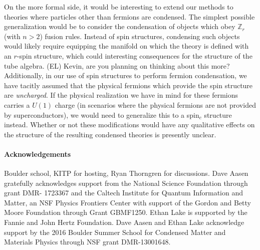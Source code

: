 \documentclass[12pt,a4paper]{article}
\newcommand{\zz}{\mathbb{Z}}
\newcommand{\mcc}{\mathcal{C}}
\newcommand{\ethan}[1]{{\color{amethyst}\footnotesize{(EL) #1}}}
\begin{document}

On the more formal side, it would be interesting to extend our methods to theories where particles other than fermions are condensed. 
The simplest possible generalization would be to consider the condensation of objects which obey $\zz_r$ (with $n>2$) fusion rules. 
Instead of spin structures, condensing such objects would likely require equipping the manifold on which the theory is defined with an $r$-spin structure, which could interesting consequences for the structure of the 
tube algebra. \ethan{Kevin, are you planning on thinking about this more?} 
Additionally, in our use of spin structures %
to perform fermion condensation, we have tacitly assumed that the physical fermions which provide the spin structure are {\it uncharged}. 
If the physical realization we have in mind for these fermions carries a $U(1)$ charge (in scenarios where 
the physical fermions are not provided by superconductors), we would need to generalize this to a spin$_c$ structure instead. 
Whether or not these modifications would have any qualitative effects on the structure of the resulting condensed theories 
is presently unclear.  


 
 \paragraph{Acknowledgements}
 Boulder school, KITP for hosting, Ryan Thorngren for discussions. 
Dave Aasen gratefully acknowledges support from the National Science Foundation through grant DMR- 1723367
and the Caltech Institute for Quantum Information and Matter, 
an NSF Physics Frontiers Center with support of the Gordon and Betty Moore Foundation through Grant GBMF1250.
Ethan Lake is supported by the Fannie and John Hertz Foundation.
Dave Aasen and Ethan Lake acknowledge support by the 2016 Boulder Summer School for Condensed
Matter and Materials Physics through NSF grant DMR-13001648.
 
\end{document}
